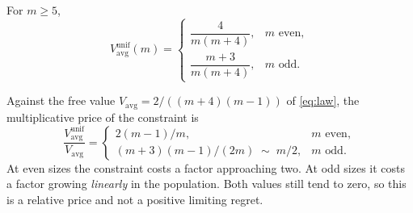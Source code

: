 \begin{theorem}
\label{thm:unifretention}
For $m\ge5$,
\begin{equation}
V^{\mathrm{unif}}_{\mathrm{avg}}(m)=
\begin{cases}
\dfrac{4}{m(m+4)}, & m\text{ even},\\[6pt]
\dfrac{m+3}{m(m+4)}, & m\text{ odd}.
\end{cases}
\label{eq:unifretention}
\end{equation}
\end{theorem}

Against the free value $V_{\mathrm{avg}}=2/((m+4)(m-1))$ of \eqref{eq:law}, the multiplicative
price of the constraint is
\begin{equation}
\frac{V^{\mathrm{unif}}_{\mathrm{avg}}}{V_{\mathrm{avg}}}
=\begin{cases}
2(m-1)/m, & m\text{ even},\\[4pt]
(m+3)(m-1)/(2m)\;\sim\;m/2, & m\text{ odd}.
\end{cases}
\label{eq:unifprice}
\end{equation}
At even sizes the constraint costs a factor approaching two. At odd sizes it costs a factor
growing \emph{linearly} in the population. Both values still tend to zero, so this is a
relative price and not a positive limiting regret.

